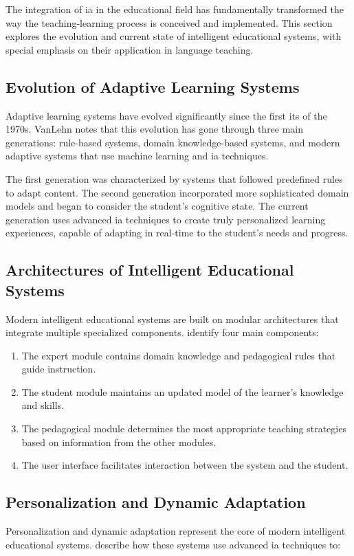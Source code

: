 The integration of \gls{ia} in the educational field has fundamentally transformed the way the teaching-learning process is conceived and implemented. This section explores the evolution and current state of intelligent educational systems, with special emphasis on their application in language teaching.

\subsection{Evolution of Adaptive Learning Systems}
Adaptive learning systems have evolved significantly since the first \gls{its} of the 1970s. VanLehn \cite{vanlehn2011relative} notes that this evolution has gone through three main generations: rule-based systems, domain knowledge-based systems, and modern adaptive systems that use machine learning and \gls{ia} techniques.

The first generation was characterized by systems that followed predefined rules to adapt content. The second generation incorporated more sophisticated domain models and began to consider the student's cognitive state. The current generation uses advanced \gls{ia} techniques to create truly personalized learning experiences, capable of adapting in real-time to the student's needs and progress.

\subsection{Architectures of Intelligent Educational Systems}
Modern intelligent educational systems are built on modular architectures that integrate multiple specialized components. \cite{anderson2020adaptive} identify four main components:

\begin{enumerate}
  \item The expert module contains domain knowledge and pedagogical rules that guide instruction.
  \item The student module maintains an updated model of the learner's knowledge and skills.
  \item The pedagogical module determines the most appropriate teaching strategies based on information from the other modules.
  \item The user interface facilitates interaction between the system and the student.
\end{enumerate}

\subsection{Personalization and Dynamic Adaptation}
Personalization and dynamic adaptation represent the core of modern intelligent educational systems. \cite{roll2018learning} describe how these systems use advanced \gls{ia} techniques to:

